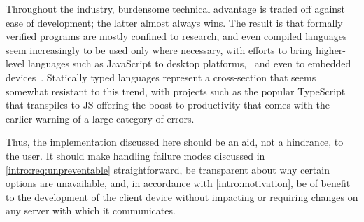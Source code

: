 Throughout the industry, burdensome technical advantage is traded off again\-st ease of development; the latter almost always wins. The result is that formally verified programs are mostly confined to research, and even compiled languages seem increasingly to be used only where necessary, with efforts to bring higher-level languages such as JavaScript to desktop platforms,~\cite{electron} and even to embedded devices~\cite{jerryscript}. Statically typed languages represent a cross-section that seems somewhat resistant to this trend, with projects such as the popular TypeScript~\cite{typescript} that transpiles to JS offering the boost to productivity that comes with the earlier warning of a large category of errors.

Thus, the implementation discussed here should be an aid, not a hindrance, to the user. It should make handling failure modes discussed in \cref{intro:req:unpreventable} straightforward, be transparent about why certain options are unavailable, and, in accordance with \cref{intro:motivation}, be of benefit to the development of the client device without impacting or requiring changes on any server with which it communicates.